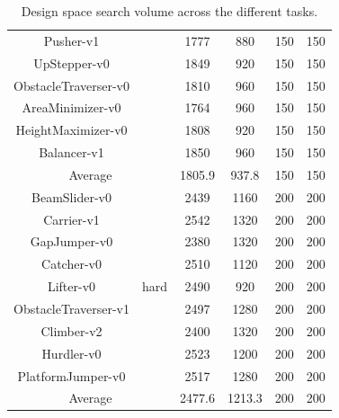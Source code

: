 \documentclass{article}
\begin{document}
\begin{table}[H]
\begin{tabular}{cccccc}
            Pusher-v1                            &                         & 1777          & 880           & 150         & 150         \\
            UpStepper-v0                         &                         & 1849          & 920           & 150         & 150         \\
            ObstacleTraverser-v0                 &                         & 1810          & 960           & 150         & 150         \\
            AreaMinimizer-v0                     &                         & 1764          & 960           & 150         & 150         \\
            HeightMaximizer-v0                   &                         & 1808          & 920           & 150         & 150         \\
            Balancer-v1                          &                         & 1850          & 960           & 150         & 150         \\
            \midrule \multicolumn{2}{c}{Average} & 1805.9                  & 937.8         & 150           & 150          \\
            \midrule BeamSlider-v0               & \multirow{9}{*}{hard}   & 2439          & 1160          & 200         & 200         \\
            Carrier-v1                           &                         & 2542          & 1320          & 200         & 200         \\
            GapJumper-v0                         &                         & 2380          & 1320          & 200         & 200         \\
            Catcher-v0                           &                         & 2510          & 1120          & 200         & 200         \\
            Lifter-v0                            &                         & 2490          & 920           & 200         & 200         \\
            ObstacleTraverser-v1                 &                         & 2497          & 1280          & 200         & 200         \\
            Climber-v2                           &                         & 2400          & 1320          & 200         & 200         \\
            Hurdler-v0                           &                         & 2523          & 1200          & 200         & 200         \\
            PlatformJumper-v0                    &                         & 2517          & 1280          & 200         & 200         \\
            \midrule \multicolumn{2}{c}{Average} & 2477.6                  & 1213.3        & 200           & 200          \\
            \bottomrule
        \end{tabular}
        \caption{Design space search volume across the different tasks.}
        \label{tab:design_space_volume}
    \end{table}
\end{document}
